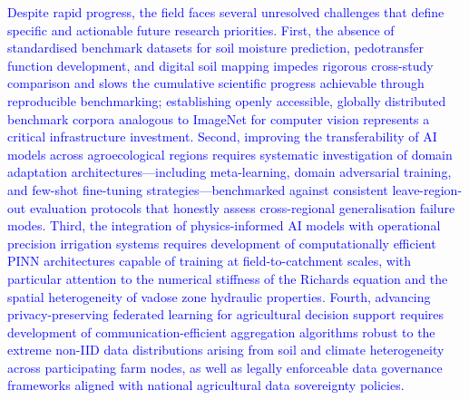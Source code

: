 \documentclass[land,article,submit,pdftex,moreauthors]{Definitions/mdpi}
\numberwithin{equation}{section}
\begin{document}
\textcolor{blue}{Despite rapid progress, the field faces several unresolved challenges that define specific and actionable future research priorities. First, the absence of standardised benchmark datasets for soil moisture prediction, pedotransfer function development, and digital soil mapping impedes rigorous cross-study comparison and slows the cumulative scientific progress achievable through reproducible benchmarking; establishing openly accessible, globally distributed benchmark corpora analogous to ImageNet for computer vision represents a critical infrastructure investment. Second, improving the transferability of AI models across agroecological regions requires systematic investigation of domain adaptation architectures---including meta-learning, domain adversarial training, and few-shot fine-tuning strategies---benchmarked against consistent leave-region-out evaluation protocols that honestly assess cross-regional generalisation failure modes. Third, the integration of physics-informed AI models with operational precision irrigation systems requires development of computationally efficient PINN architectures capable of training at field-to-catchment scales, with particular attention to the numerical stiffness of the Richards equation and the spatial heterogeneity of vadose zone hydraulic properties. Fourth, advancing privacy-preserving federated learning for agricultural decision support requires development of communication-efficient aggregation algorithms robust to the extreme non-IID data distributions arising from soil and climate heterogeneity across participating farm nodes, as well as legally enforceable data governance frameworks aligned with national agricultural data sovereignty policies.}

\footnotesize
\setlength{\LTleft}{0pt}
\setlength{\LTright}{0pt}
\end{document}
